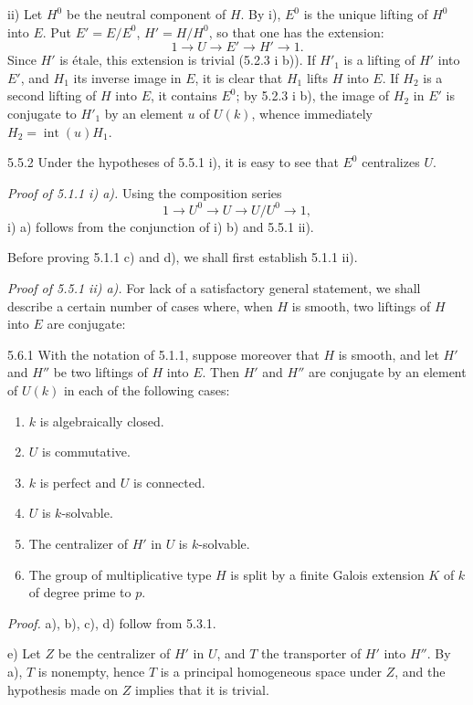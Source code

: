 ii) Let $H^0$ be the neutral component of $H$. By i), $E^0$ is the unique lifting of $H^0$ into $E$. Put $E'=E/E^0$, $H'=H/H^0$, so that one has the extension:
\[
 1\to U\to E'\to H'\to1.
\]
Since $H'$ is étale, this extension is trivial (5.2.3 i b)). If $H'_1$ is a lifting of $H'$ into $E'$, and $H_1$ its inverse image in $E$, it is clear that $H_1$ lifts $H$ into $E$. If $H_2$ is a second lifting of $H$ into $E$, it contains $E^0$; by 5.2.3 i b), the image of $H_2$ in $E'$ is conjugate to $H'_1$ by an element $u$ of $U(k)$, whence immediately $H_2=\operatorname{int}(u)H_1$.

\begin{remark}{5.5.2}\label{XVII.5.5.2}
Under the hypotheses of 5.5.1 i), it is easy to see that $E^0$ centralizes $U$.
\end{remark}
\noindent\emph{Proof of 5.1.1 i) a).} Using the composition series
\[
 1\to U^0\to U\to U/U^0\to1,
\]
i) a) follows from the conjunction of i) b) and 5.5.1 ii).

Before proving 5.1.1 c) and d), we shall first establish 5.1.1 ii).

\noindent\emph{Proof of 5.5.1 ii) a).} For lack of a satisfactory general statement, we shall describe a certain number of cases where, when $H$ is smooth, two liftings of $H$ into $E$ are conjugate:
\begin{proposition}{5.6.1}\label{XVII.5.6.1}
With the notation of 5.1.1, suppose moreover that $H$ is smooth, and let $H'$ and $H''$ be two liftings of $H$ into $E$. Then $H'$ and $H''$ are conjugate by an element of $U(k)$ in each of the following cases:
\begin{enumerate}[label=\textup{\alph*)}]
\item $k$ is algebraically closed.
\item $U$ is commutative.
\item $k$ is perfect and $U$ is connected.
\item $U$ is $k$-solvable.
\item The centralizer of $H'$ in $U$ is $k$-solvable.
\item The group of multiplicative type $H$ is split by a finite Galois extension $K$ of $k$ of degree prime to $p$.
\end{enumerate}
\end{proposition}
\noindent\emph{Proof.} a), b), c), d) follow from 5.3.1.

e) Let $Z$ be the centralizer of $H'$ in $U$, and $T$ the transporter of $H'$ into $H''$. By a), $T$ is nonempty, hence $T$ is a principal homogeneous space under $Z$, and the hypothesis made on $Z$ implies that it is trivial.


